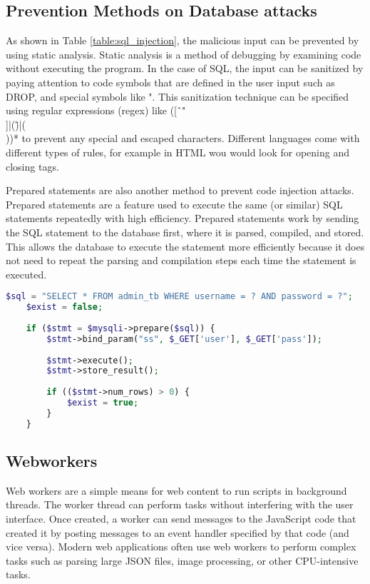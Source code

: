 \subsection{Prevention Methods on Database attacks}
As shown in Table \ref{table:sql_injection}, the malicious input can be prevented by using static analysis. Static analysis is a method of debugging by examining code without executing the program. In the case of SQL, the input can be sanitized by paying attention to code symbols that are defined in the user input such as DROP, and special symbols like ". This sanitization technique can be specified using regular expressions (regex) like ([ˆ"\\]|(\")|(\\))* to prevent any special and escaped characters. Different languages come with different types of rules, for example in HTML wou would look for opening and closing tags. 

Prepared statements are also another method to prevent code injection attacks. Prepared statements are a feature used to execute the same (or similar) SQL statements repeatedly with high efficiency. Prepared statements work by sending the SQL statement to the database first, where it is parsed, compiled, and stored. This allows the database to execute the statement more efficiently because it does not need to repeat the parsing and compilation steps each time the statement is executed.

\begin{lstlisting}[language=PHP, caption={Prepared statement example in PHP\cite{10.1145/3322645.3322704}}]
    $sql = "SELECT * FROM admin_tb WHERE username = ? AND password = ?";
    $exist = false;
    
    if ($stmt = $mysqli->prepare($sql)) {
        $stmt->bind_param("ss", $_GET['user'], $_GET['pass']);
    
        $stmt->execute();
        $stmt->store_result();
    
        if (($stmt->num_rows) > 0) {
            $exist = true;
        }
    }
    \end{lstlisting}
    
\subsection{Webworkers}
Web workers are a simple means for web content to run scripts in background threads. The worker thread can perform tasks without interfering with the user interface. Once created, a worker can send messages to the JavaScript code that created it by posting messages to an event handler specified by that code (and vice versa). Modern web applications often use web workers to perform complex tasks such as parsing large JSON files, image processing, or other CPU-intensive tasks. 

